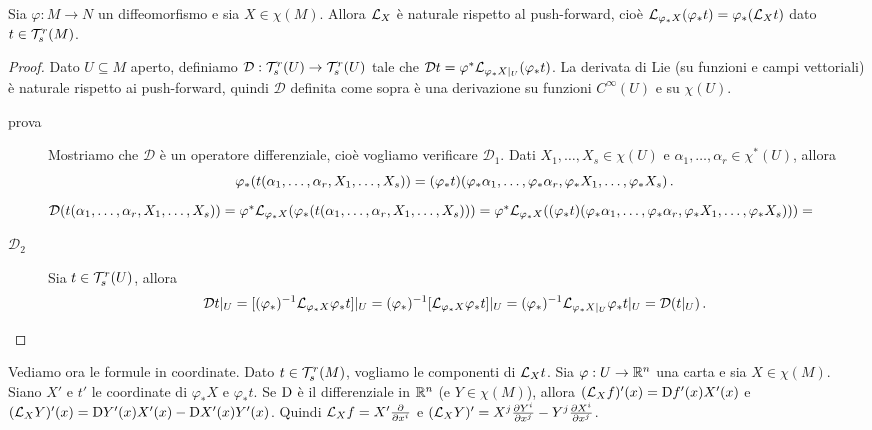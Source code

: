\begin{proposition}
	Sia $\varphi: M \to N$ un diffeomorfismo e sia $X\in\chi(M)$. Allora $\mathcal L_X$ è naturale rispetto al push-forward, cioè $\mathcal L_{\varphi_*X} (\varphi_*t) = \varphi_*(\mathcal L_Xt)$ dato $t\in\mathcal T_s^r(M)$.
\end{proposition}
\begin{proof}
	Dato $U\subseteq M$ aperto, definiamo $\mathcal D: \mathcal T_s^r(U) \to \mathcal T_s^r(U)$ tale che $\mathcal Dt = \varphi^*\mathcal L_{\varphi_*X|_ U}(\varphi_*t)$.
	La derivata di Lie (su funzioni e campi vettoriali) è naturale rispetto ai push-forward, quindi $\mathcal D$ definita come sopra è una derivazione su funzioni $C^\infty(U)$ e su $\chi(U)$.
	
	\begin{description}
	 \item [prova]

	Mostriamo che $\mathcal D$ è un operatore differenziale, cioè vogliamo verificare $\mathcal D_1$.
	Dati $X_1,\ldots,X_s\in\chi(U)$ e $\alpha_1,\ldots,\alpha_r\in\chi^*(U)$, allora
	\begin{equation*}
	\varphi_*(t(\alpha_1,\ldots,\alpha_r,X_1,\ldots,X_s) )= (\varphi_*t)(\varphi_*\alpha_1,\ldots,\varphi_*\alpha_r,\varphi_*X_1,\ldots,\varphi_*X_s)\, \text{. }
	\end{equation*}
	$\mathcal D(t(\alpha_1,\ldots,\alpha_r,X_1,\ldots,X_s)) = \varphi^*\mathcal L_{\varphi_*X}(\varphi_*(t(\alpha_1,\ldots,\alpha_r,X_1,\ldots,X_s))) = 
	\varphi^*\mathcal L_{\varphi_*X}((\varphi_*t)(\varphi_*\alpha_1,\ldots,\varphi_*\alpha_r,\varphi_*X_1,\ldots,\varphi_*X_s))) =	$ %
	
		\item [$\mathcal D_2$]
		Sia $t\in\mathcal T_s^r(U)$, allora
		\begin{equation*}
			\mathcal Dt|_ U = [(\varphi_*)^{-1} \mathcal L_{\varphi_*X}\varphi_*t]|_ U 
			= (\varphi_*)^{-1}[\mathcal L_{\varphi_*X}\varphi_*t]|_ U 
			= (\varphi_*)^{-1} \mathcal L_{\varphi_*X|_ U}\varphi_*t |_ U = \mathcal D(t|_ U) \, \text{. }
		\end{equation*}
	\end{description}
\end{proof}

Vediamo ora le formule in coordinate.
Dato $t\in\mathcal T_s^r(M)$, vogliamo le componenti di $\mathcal L_Xt$.
Sia $\varphi: U \to \mathbb R^n$ una carta e sia $X\in\chi(M)$. Siano $X'$ e $t'$ le coordinate di $\varphi_*X$ e $\varphi_*t$.
Se $\mathrm D$ è il differenziale in $\mathbb R^n$ (e $Y\in\chi(M)$), allora
$(\mathcal L_Xf)' (x) = \mathrm D f'(x) X'(x)$ e $(\mathcal L_XY)'(x) = \mathrm D Y'(x)X'(x) - \mathrm D X'(x)Y'(x)$.
Quindi $\mathcal L_X f = X' \frac{\partial }{\partial x^i}$ e $(\mathcal L_XY)' = X^j\frac{\partial Y^i}{\partial x^j} - Y^j\frac{\partial X^i}{\partial x^j}$.

